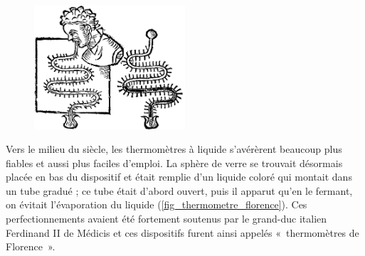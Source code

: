 	\begin{figure}
		\begin{center}
			\includegraphics[width=0.5\textwidth]{images/thermometre_medical_1625.png}
		\end{center}
		\label{fig_thermometre_medical}
	\end{figure}
	
	Vers le milieu du siècle, les thermomètres à liquide s'avérèrent beaucoup plus fiables et aussi plus faciles d'emploi. La sphère de verre se trouvait désormais placée en bas du dispositif et était remplie d'un liquide coloré qui montait dans un tube gradué ; ce tube était d'abord ouvert, puis il apparut qu'en le fermant, on évitait l'évaporation du liquide (\cref{fig_thermometre_florence}). Ces perfectionnements avaient été fortement soutenus par le grand-duc italien Ferdinand II de Médicis et ces dispositifs furent ainsi appelés «~thermomètres de Florence~».

